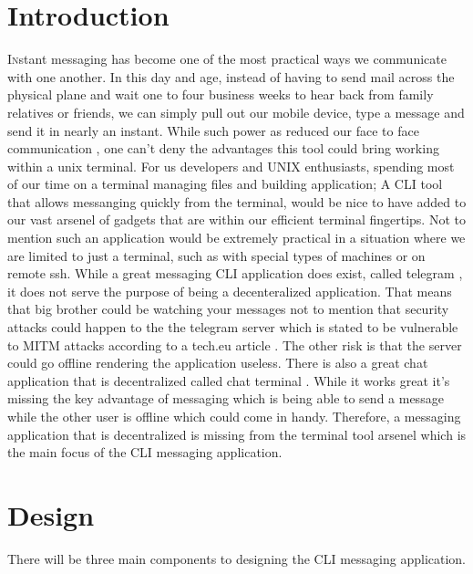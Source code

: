 \documentclass[twoside]{article}
\begin{document}
\begin{multicols}{2} %

\section{Introduction}

\lettrine[nindent=0em,lines=3]{I}nstant messaging has become one of the most practical ways we communicate with one another. In this day and age, instead of having to send mail across the physical plane and
wait one to four business weeks to hear back from family relatives or friends, we can simply pull out our mobile device, type a 
message and send it in nearly an instant. While such power as reduced our face to face communication \cite{hemmer}, one can't deny the
advantages this tool could bring working within a unix terminal. For us developers and
UNIX enthusiasts, spending most of our time on a terminal managing files and building application; A CLI tool that allows messanging quickly from the 
terminal, would be nice to have added to our vast arsenel of gadgets that are within 
our efficient terminal fingertips. Not to mention such an application would be extremely practical in a situation where we are limited 
to just a terminal, such as with special types of machines or on remote ssh. While a great messaging CLI application does exist, 
called telegram \cite{telegram}, it does not serve the purpose of being a decenteralized application. That means that big brother 
could be watching your messages not to mention that security attacks could happen to the the telegram server which is stated to be 
vulnerable to MITM attacks according to a tech.eu article \cite{wauters}. The other risk is that the server could go offline 
rendering the application useless. There is also a great chat application that is decentralized called chat terminal \cite{lanchat}. 
While it works great it's missing the key advantage of messaging which is being able to send a message while the other user is 
offline which could come in handy. Therefore,
a messaging application that is decentralized is missing from the terminal tool arsenel which is the main focus of the CLI messaging 
application. 

\section{Design}

There will be three main components to designing the CLI messaging application. 


\end{multicols}
\end{document}
